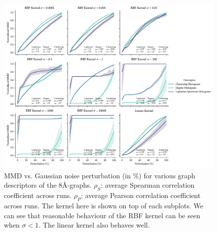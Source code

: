 \begin{figure}
  \centering
  \includegraphics[width=\textwidth]{./figures/results/res_1_2.pdf}
  \caption[Influence of kernel parameters on MMD behaviour.]{MMD vs. Gaussian
noise perturbation (in \%) for various graph descriptors of the
8\si{\angstrom}-graphs. $\rho_{S}$: average Spearman correlation coefficient
across runs. $\rho_{P}$: average Pearson correlation coefficient across runs.
The kernel here is shown on top of each subplots. We can see that reasonable
behaviour of the RBF kernel can be seen when $\sigma<1$. The linear kernel also
behaves well.}
  \label{fig:mmd_effect_kernel}
\end{figure}

